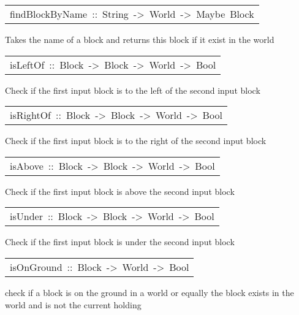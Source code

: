 \begin{haddockdesc}
\item[\begin{tabular}{@{}l}
findBlockByName\ ::\ String\ ->\ World\ ->\ Maybe\ Block
\end{tabular}]\haddockbegindoc
Takes the name of a block and returns this block if it exist in the world 
\par

\end{haddockdesc}
\begin{haddockdesc}
\item[\begin{tabular}{@{}l}
isLeftOf\ ::\ Block\ ->\ Block\ ->\ World\ ->\ Bool
\end{tabular}]\haddockbegindoc
Check if the first input block is to the left of the second input block 
\par

\end{haddockdesc}
\begin{haddockdesc}
\item[\begin{tabular}{@{}l}
isRightOf\ ::\ Block\ ->\ Block\ ->\ World\ ->\ Bool
\end{tabular}]\haddockbegindoc
Check if the first input block is to the right of the second input block 
\par

\end{haddockdesc}
\begin{haddockdesc}
\item[\begin{tabular}{@{}l}
isAbove\ ::\ Block\ ->\ Block\ ->\ World\ ->\ Bool
\end{tabular}]\haddockbegindoc
Check if the first input block is above the second input block 
\par

\end{haddockdesc}
\begin{haddockdesc}
\item[\begin{tabular}{@{}l}
isUnder\ ::\ Block\ ->\ Block\ ->\ World\ ->\ Bool
\end{tabular}]\haddockbegindoc
Check if the first input block is under the second input block 
\par

\end{haddockdesc}
\begin{haddockdesc}
\item[\begin{tabular}{@{}l}
isOnGround\ ::\ Block\ ->\ World\ ->\ Bool
\end{tabular}]\haddockbegindoc
check if a block is on the ground in a world or equally the block exists in the world and 
  is not the current holding 
\par

\end{haddockdesc}
